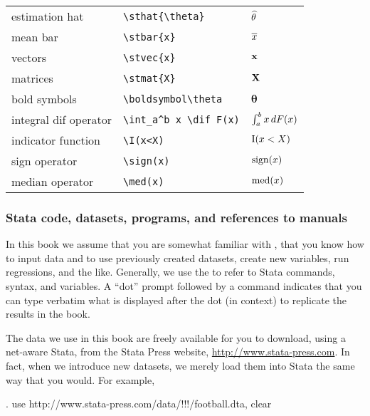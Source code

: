 \begin{itemize}[itemsep=0pt,topsep=0pt]
\begin{tabular}[t]{lll}
            estimation hat           & \verb+\sthat{\theta}+      & $\widehat{\theta}$     \\
            mean bar                 & \verb+\stbar{x}+           & $\overline{x}$          \\
            vectors                  & \verb+\stvec{x}+           & $\mathbf x$          \\
            matrices                 & \verb+\stmat{X}+           & $\mathbf X$          \\
            bold symbols             & \verb+\boldsymbol\theta+   & $\boldsymbol\theta$  \\
            integral dif operator    & \verb+\int_a^b x \dif F(x)+& $\int_a^b x \mathop{}\!d F(x)$ \\
            indicator function       & \verb+\I(x<X)+             & $\operatorname{I}(x<X)$            \\
            sign operator            & \verb+\sign(x)+            & $\operatorname{sign}(x)$            \\
            median operator          & \verb+\med(x)+             & $\operatorname*{med}(x)$            \\
        \end{tabular}
\end{itemize}



\subsubsection*{Stata code, datasets, programs, and references to manuals}

In this book we assume that you are somewhat familiar with \stata, that you
know how to input data and to use previously created datasets, create new
variables, run regressions, and the like. Generally, we use the 
to refer to Stata commands, syntax, and variables. A “dot”
prompt followed by a command indicates that you can type verbatim what is
displayed after the dot (in context) to replicate the results in the book.

The data we use in this book are freely available for you to download, using a
net-aware Stata, from the Stata Press website,
\url{http://www.stata-press.com}. In fact, when we introduce new datasets, we
merely load them into Stata the same way that you would. For example,

\begin{stlog}
. use http://www.stata-press.com/data/!!!/football.dta, clear
\end{stlog}

